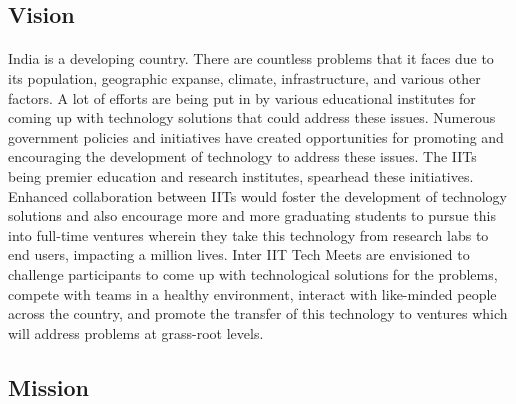 \subsection{Vision}
\paragraph{}
India is a developing country. There are countless problems that it faces due to its population,  geographic expanse, climate, infrastructure, and various other factors. A lot of efforts are being put in by various educational institutes for coming up with technology solutions that could address these issues. Numerous government policies and initiatives have created opportunities for promoting and encouraging the development of technology to address these issues. The IITs being premier education and research institutes, spearhead these initiatives. Enhanced collaboration between IITs would foster the development of technology solutions and also encourage more and more graduating students to pursue this into full-time ventures wherein they take this technology from research labs to end users, impacting a million lives. Inter IIT Tech Meets are envisioned to challenge participants to come up with technological solutions for the problems, compete with teams in a healthy environment, interact with like-minded people across the country, and promote the transfer of this technology to ventures which will address problems at grass-root levels.

\subsection{Mission}
